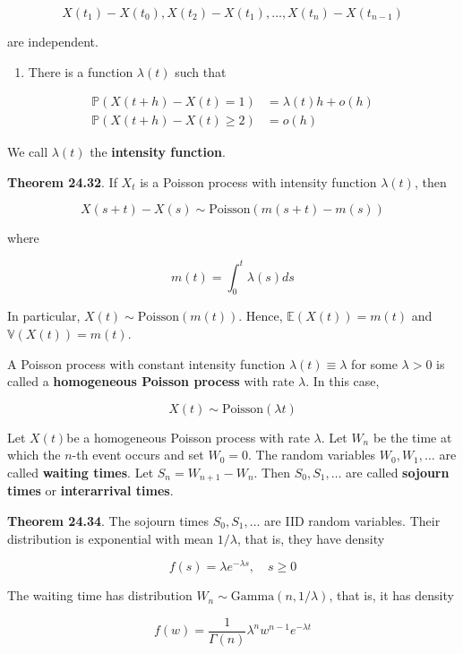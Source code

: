 \[ X(t_1) - X(t_0), X(t_2) - X(t_1), \dots, X(t_n) - X(t_{n - 1})\]

are independent.

\begin{enumerate}[tightlist,label={\arabic*.},resume]
\item
  There is a function \(\lambda(t)\) such that
\end{enumerate}

\[
\begin{align}
\mathbb{P}\left(X(t + h) - X(t) = 1\right) &= \lambda(t)h + o(h) \\
\mathbb{P}\left(X(t + h) - X(t) \geq 2\right) &= o(h)
\end{align}
\]

We call \(\lambda(t)\) the \textbf{intensity function}.

\textbf{Theorem 24.32}. If \(X_t\) is a Poisson process with intensity
function \(\lambda(t)\), then

\[ X(s + t) - X(s) \sim \text{Poisson}\left( m(s + t) - m(s) \right) \]

where

\[ m(t) = \int_0^t \lambda(s) ds \]

In particular, \(X(t) \sim \text{Poisson}(m(t))\). Hence,
\(\mathbb{E}(X(t)) = m(t)\) and \(\mathbb{V}(X(t)) = m(t)\).

A Poisson process with constant intensity function
\(\lambda(t) \equiv \lambda\) for some \(\lambda > 0\) is called a
\textbf{homogeneous Poisson process} with rate \(\lambda\). In this
case,

\[ X(t) \sim \text{Poisson}(\lambda t) \]

Let \(X(t)\)be a homogeneous Poisson process with rate \(\lambda\). Let
\(W_n\) be the time at which the \(n\)-th event occurs and set
\(W_0 = 0\). The random variables \(W_0, W_1, \dots\) are called
\textbf{waiting times}. Let \(S_n = W_{n + 1} - W_n\). Then
\(S_0, S_1, \dots\) are called \textbf{sojourn times} or
\textbf{interarrival times}.

\textbf{Theorem 24.34}. The sojourn times \(S_0, S_1, \dots\) are IID
random variables. Their distribution is exponential with mean
\(1 / \lambda\), that is, they have density

\[ f(s) = \lambda e^{-\lambda s}, \quad s \geq 0 \]

The waiting time has distribution
\(W_n \sim \text{Gamma}(n, 1 / \lambda)\), that is, it has density

\[ f(w) = \frac{1}{\Gamma(n)} \lambda^n w^{n - 1}e^{-\lambda t} \]

